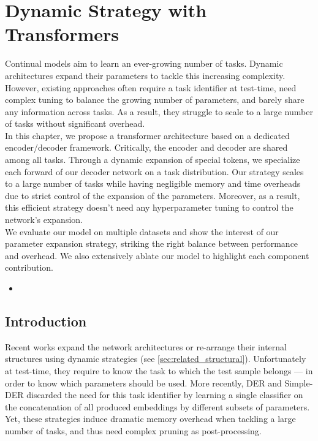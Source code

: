 \chapter{Dynamic Strategy with Transformers}
\label{chapter:dynamic}

\begin{chapabstract}
    Continual models aim to learn an ever-growing number of tasks. Dynamic architectures expand
    their parameters to tackle this increasing complexity. However,
    existing approaches often require a task identifier at test-time, need complex tuning to balance
    the growing number of parameters, and barely share any information across tasks. As a result,
    they struggle to scale to a large number of tasks without significant overhead.\\
    In this chapter, we propose a transformer architecture based on a dedicated encoder/decoder
    framework. Critically, the encoder and decoder are shared among all tasks. Through a dynamic
    expansion of special tokens, we specialize each forward of our decoder network on a task
    distribution. Our strategy scales to a large number of tasks while having negligible memory and
    time overheads due to strict control of the expansion of the parameters. Moreover, as a result,
    this efficient strategy doesn't need any hyperparameter tuning to control the network's
    expansion.\\
    We evaluate our model on multiple datasets and show the interest of our parameter expansion strategy,
    striking the right balance between performance and overhead. We also extensively ablate our
    model to highlight each component contribution.

    \begin{itemize}
        \item {}
    \end{itemize}

\end{chapabstract}
\newpage

\minitoc
{} 



\section{Introduction}
\label{sec:dytox_intro}


Recent works expand the network architectures or re-arrange their internal structures using dynamic
strategies (see \autoref{sec:related_structural}). Unfortunately at test-time, they require to know
the task to which the test sample belongs --- in order to know which parameters should be used. More
recently, DER \citep{yan2021der} and Simple-DER \citep{li2021preserve} discarded the need for this
task identifier by learning a single classifier on the concatenation of all produced embeddings by
different subsets of parameters. Yet, these strategies induce dramatic memory overhead when tackling
a large number of tasks, and thus need complex pruning as post-processing.

